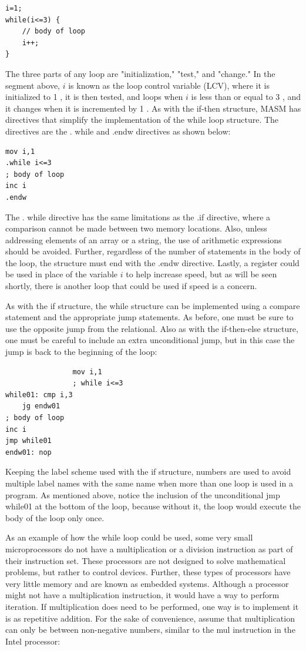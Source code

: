 \documentclass[10pt]{book}
\begin{document}
\begin{verbatim}
i=1;
while(i<=3) {
    // body of loop
    i++;
}
\end{verbatim}

The three parts of any loop are "initialization," "test," and "change." In the segment above, $i$ is known as the loop control variable (LCV), where it is initialized to 1 , it is then tested, and loops when $i$ is less than or equal to 3 , and it changes when it is incremented by 1 . As with the if-then structure, MASM has directives that simplify the implementation of the while loop structure. The directives are the . while and .endw directives as shown below:

\begin{verbatim}
mov i,1
.while i<=3
; body of loop
inc i
.endw
\end{verbatim}

The . while directive has the same limitations as the .if directive, where a comparison cannot be made between two memory locations. Also, unless addressing elements of an array or a string, the use of arithmetic expressions should be avoided. Further, regardless of the number of statements in the body of the loop, the structure must end with the .endw directive. Lastly, a register could be used in place of the variable $i$ to help increase speed, but as will be seen shortly, there is another loop that could be used if speed is a concern.

As with the if structure, the while structure can be implemented using a compare statement and the appropriate jump statements. As before, one must be sure to use the opposite jump from the relational. Also as with the if-then-else structure, one must be careful to include an extra unconditional jump, but in this case the jump is back to the beginning of the loop:

\begin{verbatim}
                mov i,1
                ; while i<=3
while01: cmp i,3
    jg endw01
; body of loop
inc i
jmp while01
endw01: nop
\end{verbatim}

Keeping the label scheme used with the if structure, numbers are used to avoid multiple label names with the same name when more than one loop is used in a program. As mentioned above, notice the inclusion of the unconditional jmp while01 at the bottom of the loop, because without it, the loop would execute the body of the loop only once.

As an example of how the while loop could be used, some very small microprocessors do not have a multiplication or a division instruction as part of their instruction set. These processors are not designed to solve mathematical problems, but rather to control devices. Further, these types of processors have very little memory and are known as embedded systems. Although a processor might not have a multiplication instruction, it would have a way to perform iteration. If multiplication does need to be performed, one way is to implement it is as repetitive addition. For the sake of convenience, assume that multiplication can only be between non-negative numbers, similar to the mul instruction in the Intel processor:
\end{document}

